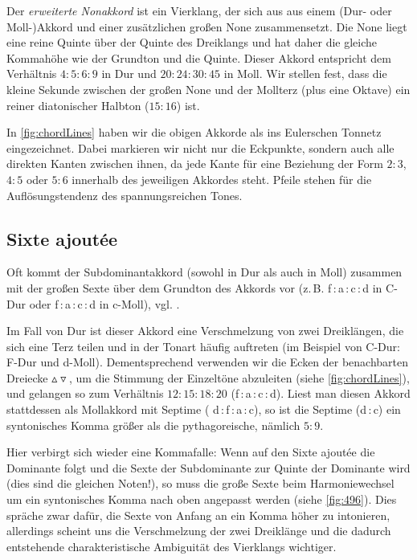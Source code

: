Der \emph{erweiterte Nonakkord} ist ein Vierklang, der sich aus aus einem (Dur-
oder Moll-)Akkord und einer zusätzlichen großen None zusammensetzt.  Die None
liegt eine reine Quinte über der Quinte des Dreiklangs und hat daher die gleiche
Kommahöhe wie der Grundton und die Quinte. Dieser
Akkord entspricht dem Verhältnis $4:5:6:9$ in Dur und $20:24:30:45$ in Moll. Wir
stellen fest, dass die kleine Sekunde zwischen der großen None und der Mollterz
(plus eine Oktave) ein reiner diatonischer Halbton ($15:16$) ist.

In \cref{fig:chordLines} haben wir die obigen Akkorde als ins Eulerschen Tonnetz
eingezeichnet. Dabei markieren wir nicht nur die Eckpunkte, sondern auch alle
direkten Kanten zwischen ihnen, da jede Kante für eine Beziehung der Form $2:3$,
$4:5$ oder $5:6$ innerhalb des jeweiligen Akkordes steht. Pfeile stehen für die
Auflösungstendenz des spannungsreichen Tones.

\subsection{Sixte ajoutée}
\label{sec:sixte}

Oft kommt der Subdominantakkord (sowohl in Dur als auch in Moll) zusammen mit
der großen Sexte über dem Grundton des Akkords vor (z.\,B. f\,:\,a\,:\,c\,:\,d
in C-Dur oder f\,:\,\flat a\,:\,c\,:\,d in c-Moll), vgl. \cite[{}9.3]{Skript}.

Im Fall von Dur ist dieser Akkord eine Verschmelzung von zwei Dreiklängen, die
sich eine Terz teilen und in der Tonart häufig auftreten (im Beispiel von C-Dur:
F-Dur und d-Moll). Dementsprechend verwenden wir die Ecken der benachbarten
Dreiecke \mbox{$\vartriangle\!\!\!\triangledown$}, um die Stimmung der
Einzeltöne abzuleiten (siehe \cref{fig:chordLines}), und gelangen so zum
Verhältnis $12:15:18:20$ (f\,:\,\naturalm a\,:\,c\,:\,\natural d).  Liest man
diesen Akkord stattdessen als Mollakkord mit Septime (\naturalm
d\,:\,f\,:\,\naturalm a\,:\,c), so ist die Septime (\naturalm d\,:\,c) ein
syntonisches Komma größer als die pythagoreische, nämlich $5:9$.

Hier verbirgt sich wieder eine Kommafalle: Wenn auf den Sixte ajoutée die
Dominante folgt und die Sexte der Subdominante zur Quinte der Dominante wird
(dies sind die gleichen Noten!), so muss die große Sexte beim Harmoniewechsel um
ein syntonisches Komma nach oben angepasst werden (siehe \cref{fig:496}).  Dies
spräche zwar dafür, die Sexte von Anfang an ein Komma höher zu intonieren,
allerdings scheint uns die Verschmelzung der zwei Dreiklänge und die dadurch
entstehende charakteristische Ambiguität des Vierklangs wichtiger.

